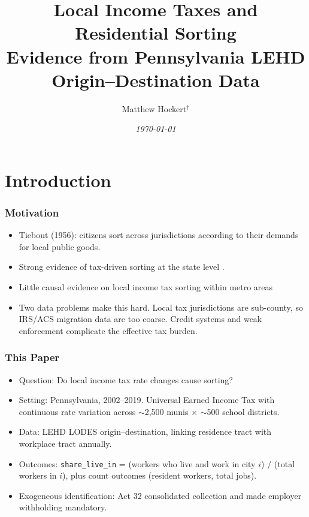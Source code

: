 \documentclass[xcolor = x11names, compress, aspectratio = 169]{beamer}
\renewcommand{\(}{\begin{columns}}
\renewcommand{\)}{\end{columns}}
\newcommand{\<}[1]{\begin{column}{#1}}
\renewcommand{\>}{\end{column}}
\begin{document}
\begin{frame}
    \title{Local Income Taxes and Residential Sorting \\
    \large Evidence from Pennsylvania LEHD Origin--Destination Data}
    \author[Hockert]{Matthew Hockert$^\dagger$}
    \date{\small{\textit{\today}}}
    \titlepage
\end{frame}

\section{Introduction}

\begin{frame}
\frametitle{Motivation}
    \begin{itemize}\setlength{\itemsep}{0.25cm}
        \item Tiebout (1956): citizens sort across jurisdictions
        according to their demands for local public goods.
        \item Strong evidence of tax-driven sorting at the state level
        \citep{kleven2020, young2016}.
        \item Little causal evidence on local income tax sorting within
        metro areas
        \item Two data problems make this hard. Local tax jurisdictions
        are sub-county, so IRS/ACS migration data are too coarse.
        Credit systems and weak enforcement complicate the effective
        tax burden.
    \end{itemize}
\end{frame}

\begin{frame}
\frametitle{This Paper}
    \begin{itemize}\setlength{\itemsep}{0.2cm}
        \item Question: Do local income tax rate changes cause sorting?
        \item Setting: Pennsylvania, 2002--2019. Universal Earned
        Income Tax with continuous rate variation across $\sim$2{,}500
        munis $\times$ $\sim$500 school districts.
        \item Data: LEHD LODES origin--destination, linking
        residence tract with workplace tract annually.
        \item Outcomes: \texttt{share\_live\_in}
        = (workers who live and work in city $i$) / (total workers in $i$),
        plus count outcomes (resident workers, total jobs).
        \item Exogeneous identification: Act 32
        consolidated collection and made employer withholding
        mandatory.
    \end{itemize}
\end{frame}
\end{document}
